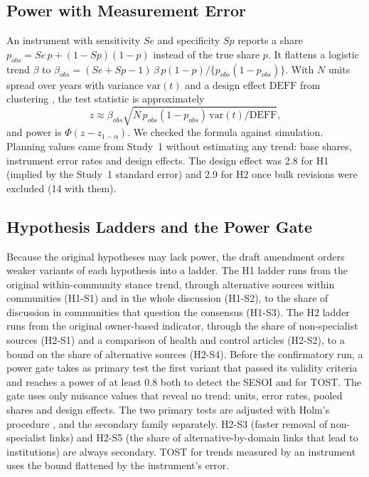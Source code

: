 \documentclass[10pt,a4paper]{article}
\begin{document}
\subsection{Power with Measurement Error}
An instrument with sensitivity $Se$ and specificity $Sp$ reports a share $p_{obs} = Se\,p + (1-Sp)(1-p)$
instead of the true share $p$. It flattens a logistic trend $\beta$ to
$\beta_{obs} = (Se+Sp-1)\,\beta\,p(1-p)/\{p_{obs}(1-p_{obs})\}$. With $N$ units spread over years with
variance $\mathrm{var}(t)$ and a design effect $\mathrm{DEFF}$ from clustering \cite{kish1965}, the test
statistic is approximately
\begin{equation}
z \approx \beta_{obs}\sqrt{N\,p_{obs}(1-p_{obs})\,\mathrm{var}(t)/\mathrm{DEFF}},
\end{equation}
and power is $\Phi(z - z_{1-\alpha})$. We checked the formula against simulation. Planning values came from
Study~1 without estimating any trend: base shares, instrument error rates and design effects. The design
effect was 2.8 for H1 (implied by the Study~1 standard error) and 2.9 for
H2 once bulk revisions were excluded (14 with them).

\subsection{Hypothesis Ladders and the Power Gate}
\label{sec:ladders}
Because the original hypotheses may lack power, the draft amendment orders weaker variants of each
hypothesis into a ladder. The H1 ladder runs from the original within-community stance trend, through
alternative sources within communities (H1-S1) and in the whole discussion (H1-S2), to the share of
discussion in communities that question the consensus (H1-S3). The H2 ladder runs from the original
owner-based indicator, through the share of non-specialist sources (H2-S1) and a comparison of health and
control articles (H2-S2), to a bound on the share of alternative sources (H2-S4). Before the confirmatory
run, a power gate takes as primary test the first variant that passed its validity criteria and reaches a
power of at least 0.8 both to detect the SESOI and for TOST. The gate uses only nuisance values that reveal
no trend: units, error rates, pooled shares and design effects. The two primary tests are adjusted with
Holm's procedure \cite{holm1979}, and the secondary family separately. H2-S3 (faster removal of
non-specialist links) and H2-S5 (the share of alternative-by-domain links that lead to institutions)
are always secondary. TOST for trends measured by an instrument uses the bound flattened by
the instrument's error.
\end{document}
